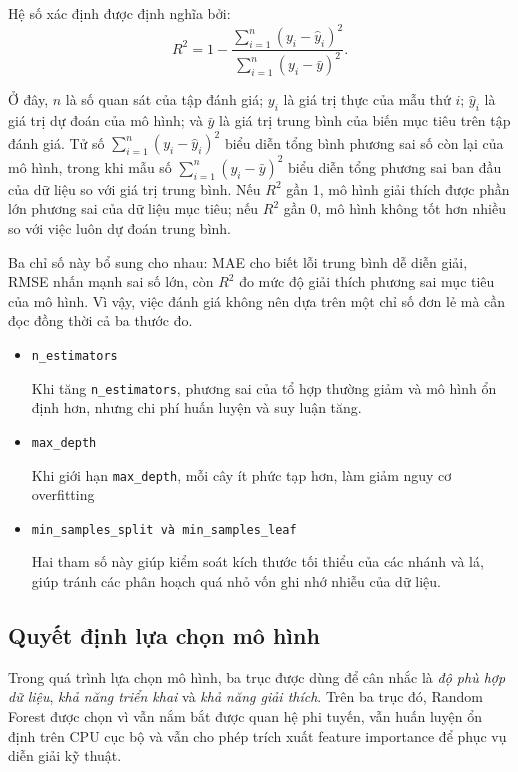Hệ số xác định được định nghĩa bởi:
$$
R^2 = 1 - \frac{\sum_{i=1}^{n}(y_i - \hat{y}_i)^2}{\sum_{i=1}^{n}(y_i - \bar{y})^2}.
$$

Ở đây, $n$ là số quan sát của tập đánh giá; $y_i$ là giá trị thực của mẫu thứ $i$; $\hat{y}_i$ là giá trị dự đoán của mô hình; và $\bar{y}$ là giá trị trung bình của biến mục tiêu trên tập đánh giá. Tử số $\sum_{i=1}^{n}(y_i-\hat{y}_i)^2$ biểu diễn tổng bình phương sai số còn lại của mô hình, trong khi mẫu số $\sum_{i=1}^{n}(y_i-\bar{y})^2$ biểu diễn tổng phương sai ban đầu của dữ liệu so với giá trị trung bình. Nếu $R^2$ gần 1, mô hình giải thích được phần lớn phương sai của dữ liệu mục tiêu; nếu $R^2$ gần 0, mô hình không tốt hơn nhiều so với việc luôn dự đoán trung bình.

Ba chỉ số này bổ sung cho nhau: MAE cho biết lỗi trung bình dễ diễn giải, RMSE nhấn mạnh sai số lớn, còn $R^2$ đo mức độ giải thích phương sai mục tiêu của mô hình. Vì vậy, việc đánh giá không nên dựa trên một chỉ số đơn lẻ mà cần đọc đồng thời cả ba thước đo.

\begin{itemize}
    \item \texttt{n\_estimators}

    Khi tăng \texttt{n\_estimators}, phương sai của tổ hợp thường giảm và mô hình ổn định hơn, nhưng chi phí huấn luyện và suy luận tăng.

    \item \texttt{max\_depth}

    Khi giới hạn \texttt{max\_depth}, mỗi cây ít phức tạp hơn, làm giảm nguy cơ overfitting

    \item \texttt{min\_samples\_split và min\_samples\_leaf}

    Hai tham số này giúp kiểm soát kích thước tối thiểu của các nhánh và lá, giúp tránh các phân hoạch quá nhỏ vốn ghi nhớ nhiễu của dữ liệu.
\end{itemize}
  
\subsection{Quyết định lựa chọn mô hình}

Trong quá trình lựa chọn mô hình, ba trục được dùng để cân nhắc là \textit{độ phù hợp dữ liệu}, \textit{khả năng triển khai} và \textit{khả năng giải thích}. Trên ba trục đó, Random Forest được chọn vì vẫn nắm bắt được quan hệ phi tuyến, vẫn huấn luyện ổn định trên CPU cục bộ và vẫn cho phép trích xuất feature importance để phục vụ diễn giải kỹ thuật.

